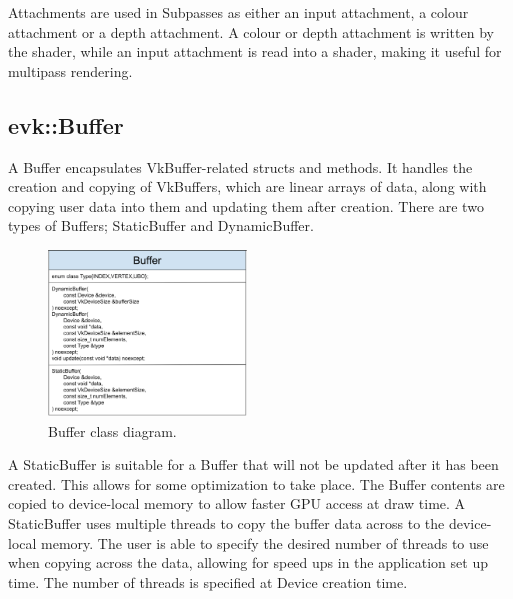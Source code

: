 \documentclass[12pt]{report}
\newcommand{\imagewidth}{0.47\textwidth}
\theoremstyle{definition}
\begin{document}
        Attachments are used in Subpasses as either an input attachment, a
        colour attachment or a depth attachment. A colour or depth attachment
        is written by the shader, while an input attachment is read into a
        shader, making it useful for multipass rendering.

      \subsection{evk::Buffer}

        A Buffer encapsulates VkBuffer-related structs and methods. It handles
        the creation and copying of VkBuffers, which are linear arrays of
        data, along with copying user data into them and updating them after
        creation. There are two types of Buffers; StaticBuffer and
        DynamicBuffer. \\

        \begin{figure}[h!]
          \centering
          \includegraphics[width=\imagewidth]{images/class_buffer.png}
          \caption{Buffer class diagram.}
          \label{fig:class_buffer}  
        \end{figure}

        A StaticBuffer is suitable for a Buffer that will not be
        updated after it has been created. This allows for some optimization
        to take place. The Buffer contents are copied to device-local memory
        to allow faster GPU access at draw time. A StaticBuffer uses multiple threads
        to copy the buffer data across to the device-local memory. The user is able
        to specify the desired number of threads to use when copying across the data,
        allowing for speed ups in the application set up time. The number of threads is
        specified at Device creation time.\\
\end{document}
